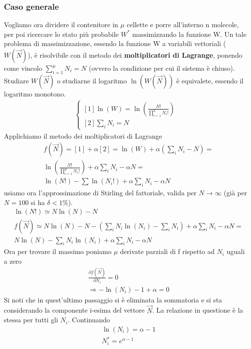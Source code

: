 \documentclass[
10pt, %
a4paper, %
oneside, %
headinclude,footinclude, %
BCOR5mm, %
]{scrartcl}
\begin{document}
\subsubsection*{Caso generale}
Vogliamo ora dividere il contenitore in $\mu$ cellette e porre all'interno n molecole, per poi ricercare lo stato più probabile \(W^*\) massimizzando la funzione W. Un tale problema di massimizzazione, essendo la funzione W a variabili vettoriali (\(W(\vec{N})\)), è risolvibile con il metodo dei \textbf{moltiplicatori di Lagrange}, ponendo come vincolo \(\sum_{i=1}^{\mu}N_i = N\) (ovvero la condizione per cui il sistema è chiuso).\\
Studiare \(W(\vec{N})\) o studiarne il logaritmo \(\ln(W(\vec{N}))\) è equivalete, essendo il logaritmo monotono. 
\begin{align*}
	\begin{cases}
		[1]\ln(W)=\ln\left(\frac{N!}{\prod_{i=1}^\mu N_i!}\right)\\
		[2]\sum_i N_i = N
	\end{cases}
\end{align*}
Applichiamo il metodo dei moltiplicatori di Lagrange
\begin{align*}
	&f(\vec{N})=[1]+\alpha[2]=\ln(W)+\alpha(\sum_iN_i -N)=\\
	&\ln\left(\frac{N!}{\prod_{i=1}^{\mu}N_i!}\right)+\alpha\sum_iN_i-\alpha N=\\
	&\ln(N!)-\sum\ln(N_i!)+\alpha \sum_i N_i -\alpha N
\end{align*}
usiamo ora l'approssimazione di Stirling del fattoriale, valida per \(N\to\infty\) (già per \(N=100\) si ha \(\delta < 1\%\)). 
\begin{align*}
	&\ln(N!)\simeq N \ln(N)-N\\
	&f(\vec{N})\simeq N\ln(N)-N-(\sum_iN_i\ln(N_i)-\sum_iN_i)+\alpha\sum_iN_i-\alpha N=\\
	&N\ln(N)-\sum_iN_i\ln(N_i)+\alpha\sum_iN_i-\alpha N
\end{align*}
Ora per trovare il massimo poniamo $\mu$ derivate parziali di f rispetto ad \(N_i\) uguali a zero 
\begin{align*}
	&\frac{\partial f(\vec{N})}{\partial N_i}=0\\
	&\Rightarrow -\ln(N_i)-1+\alpha =0
\end{align*}
Si noti che in quest'ultimo passaggio si è eliminata la sommatoria e si sta considerando la componente i-esima del vettore \(\vec{N}\). La relazione in questione è la stessa per tutti gli \(N_i\). Continuando
\begin{align*}
	&\ln(N_i) = \alpha - 1\\
	&N_i^* = e^{\alpha - 1}
\end{align*}
\end{document}
